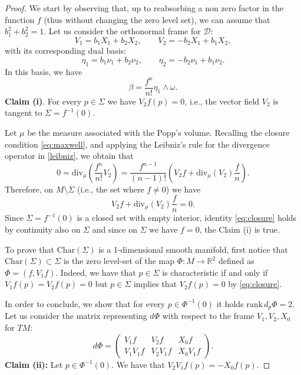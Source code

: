 \documentclass{amsart}
\theoremstyle{plain}
\theoremstyle{definition}
\theoremstyle{remark}
\newcommand{\R}{\mathbb{R}}
\newcommand{\diff}{d}%
\newcommand{\distr}{\mathcal{D}}								%
\newcommand{\B}{\beta}
\begin{document}
\begin{proof}
We start by observing that, up to reabsorbing a non zero factor in the function $f$ (thus without changing the zero level set), we can assume that $b_1^2+b_2^2=1$.
Let us consider the orthonormal frame for $\distr$:
\begin{equation}
V_1= b_1X_1+b_2X_2, \qquad V_2 = -b_2X_1+b_1X_2,
\end{equation}
with its corresponding dual basis:
\begin{equation}
\eta_1= b_1\nu_1+b_2\nu_2, \qquad \eta_2=-b_2\nu_1+b_1\nu_2.
\end{equation}
In this basis, we have
\begin{equation}
\B=\frac{f^n}{n!}\eta_1\wedge\omega.
\end{equation}
{\bf Claim (i)}. For every $p\in \Sigma$ we have $V_2f(p)=0$, i.e., the vector field $V_{2}$ is tangent to $\Sigma=f^{-1}(0)$.

\smallskip
Let $\mu$ be the measure associated with the Popp's volume.
Recalling the closure condition \eqref{eq:maxwell}, and applying the Leibniz's rule for the divergence operator in \eqref{leibniz}, we obtain that  
\begin{equation}
0=\mathrm{div}_\mu\left(\frac{f^n}{n!}V_2\right)=\frac{f^{n-1}}{(n-1)!}\left(V_2f+\mathrm{div}_\mu(V_2)\frac{f}{n}\right).
\end{equation}
Therefore, on $M\setminus \Sigma$ (i.e., the set where $f\neq 0$) we have
\begin{equation}
\label{eq:closure}
V_2f+\mathrm{div}_\mu(V_2)\frac{f}{n}=0.
\end{equation} 
Since $\Sigma=f^{-1}(0)$ is a closed set with empty interior, identity \eqref{eq:closure} holds by continuity also on $\Sigma$ and since on $
\Sigma$ we have $f=0$, the Claim (i) is true.

\smallskip
To prove that $\mathrm{Char}(\Sigma)$ is a 1-dimensional smooth manifold, first notice that $\mathrm{Char}(\Sigma)\subset \Sigma$ is the zero level-set of the map $\Phi:M\to \R^2$ defined as $\Phi=(f,V_1f)$. 
Indeed, we have that $p\in \Sigma$ is characteristic if and only if  $V_1f(p)=V_2f(p)=0$ but  $p\in \Sigma$ implies that $V_2f(p)=0$ by \eqref{eq:closure}.

In order to conclude, we show that  for every $p\in \Phi^{-1}(0)$ it holds $\mathrm{rank}\, \diff _p\Phi=2$.
Let us consider the matrix representing $\diff \Phi$ with respect to the frame $V_1,V_2, X_0$ for $TM$:
\begin{equation}\label{eq:db130}
\diff \Phi =
\left( \begin{array}{ccc}
V_1f & V_2f &X_0f \\
V_1V_1f &V_2 V_1f & X_0 V_1f
\end{array} \right).
\end{equation}
{\bf Claim (ii):} Let $p\in \Phi^{-1}(0)$. We have that $V_2V_1f(p)= -X_0f(p)$.


\end{proof}
\end{document}
